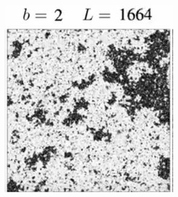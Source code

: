 \documentclass[]{article}
\begin{document}
\begin{figure}[H]
	\caption[Evolving $T=T_c$ after \cite{ashton2012renormalization}]{Evolving $T=T_c$ after \cite{ashton2012renormalization}.  little islands shrink, but there are larger islands of correlation that scale down to take their place. There are fluctuations on all scale, in a uniform ''fractal'' pattern. }
	\begin{subfigure}[t]{0.3\textwidth}
		\includegraphics[width=\textwidth]{DouglasAshton3-1}
	\end{subfigure}
	\begin{subfigure}[t]{0.3\textwidth}

\end{subfigure}
\end{figure}
\end{document}
